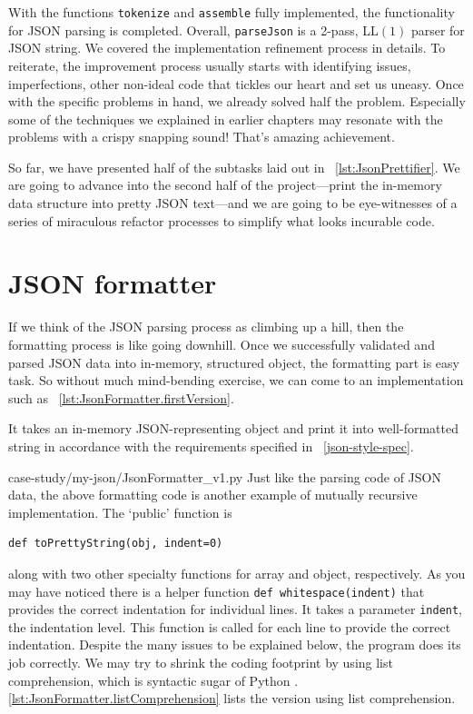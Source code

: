 \documentclass[oneside,11pt]{book}
\theoremstyle{definition}
\theoremstyle{remark}
\newcommand{\code}[1]{\mbox{\lstinline{#1}}}
\newcommand{\python}{Python }
\begin{document}
With the functions \code{tokenize} and \code{assemble} fully implemented,
the functionality for JSON parsing is completed.
Overall, \code{parseJson} is a 2-pass, LL$(1)$ parser for JSON string.
We covered the implementation refinement process in details.
To reiterate, the improvement process usually starts with identifying issues,
imperfections, other non-ideal code that tickles our heart and set us uneasy.
Once with the specific problems in hand, we already solved half the problem.
Especially some of the techniques we explained in earlier chapters may
resonate with the problems with a crispy snapping sound!
That's amazing achievement.

So far, we have presented half of the subtasks laid out in ~\autoref{lst:JsonPrettifier}.
We are going to advance into the second half of the project---print the in-memory data
structure into pretty JSON text---and we are going to be eye-witnesses of a series of
miraculous refactor processes to simplify what looks incurable code.

\section{JSON formatter}\label{sec:jsonFormatter}

If we think of the JSON parsing process as climbing up a hill, then
the formatting process is like going downhill.
Once we successfully validated and parsed JSON data into in-memory, structured object,
the formatting part is easy task.
So without much mind-bending exercise, we can come to an implementation such as
~\autoref{lst:JsonFormatter.firstVersion}.

It takes an in-memory JSON-representing object and print it into well-formatted string in
accordance with the requirements specified in ~\autoref{json-style-spec}.

{case-study/my-json/JsonFormatter_v1.py}
Just like the parsing code of JSON data, the above formatting code is another example of
mutually recursive implementation.
The `public' function is
\begin{lstlisting}[label={lst:toPrettyString}]
def toPrettyString(obj, indent=0)
\end{lstlisting}
along with two other specialty functions for array and object, respectively.
As you may have noticed there is a helper function \code{def whitespace(indent)} that provides
the correct indentation for individual lines.
It takes a parameter \code{indent}, the indentation level.
This function is called for each line to provide the correct indentation.
Despite the many issues to be explained below, the program does its job correctly.
We may try to shrink the coding footprint by using list comprehension, which is syntactic sugar of
\python.
\autoref{lst:JsonFormatter.listComprehension} lists the version using list comprehension.
\end{document}
